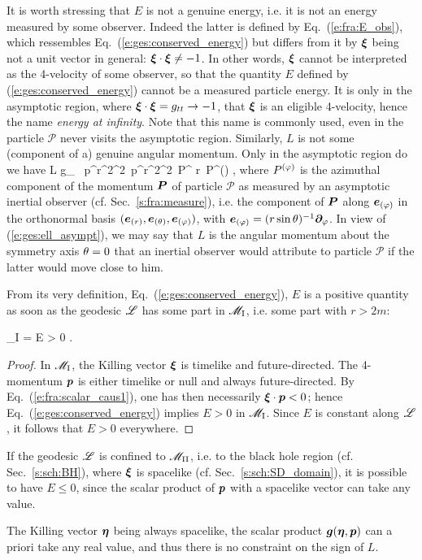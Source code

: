 It is worth stressing that $E$ is not a genuine energy, i.e. it is not
an energy measured by some observer. Indeed the latter is defined by
Eq.~(\ref{e:fra:E_obs}), which ressembles Eq.~(\ref{e:ges:conserved_energy})
but differs from it by $\bm{\xi}$ being not a unit vector in general:
$\bm{\xi}\cdot\bm{\xi} \not = -1$. In other words, $\bm{\xi}$ cannot
be interpreted as the 4-velocity of some observer, so that the quantity
$E$ defined by (\ref{e:ges:conserved_energy}) cannot be a measured
particle energy. It is only in the asymptotic region, where $\bm{\xi}\cdot\bm{\xi} = g_{tt}
\rightarrow -1$, that $\bm{\xi}$ is an eligible 4-velocity, hence the name
\emph{energy at infinity}. Note that this name is commonly used, even in the
particle $\mathscr{P}$ never visits the asymptotic region.
Similarly, $L$ is not some (component of a) genuine angular momentum. Only in the
asymptotic region do we have
\be \label{e:ges:ell_asympt}
    L \simeq g_{\ph\ph} \, p^\ph \simeq r^2\sin^2\ph \, p^\ph \simeq r^2\sin^2\theta \, P^\ph
    \simeq r\sin\th \, P^{(\ph)} ,
\ee
where $P^{(\varphi)}$ is the azimuthal component of the momentum $\bm{P}$ of particle $\mathscr{P}$
as measured by an asymptotic inertial observer (cf. Sec.~\ref{s:fra:measure}), i.e.
the component of $\bm{P}$ along $\bm{e}_{(\varphi)}$ in the orthonormal basis $(\bm{e}_{(r)}, \bm{e}_{(\theta)}, \bm{e}_{(\varphi)})$, with $\bm{e}_{(\varphi)} = (r\sin\theta)^{-1} \bm{\partial}_\varphi$.
In view of (\ref{e:ges:ell_asympt}), we may say that $L$ is the angular momentum
about the symmetry axis $\theta=0$ that an inertial observer would attribute to
particle $\mathscr{P}$ if the latter would move close to him.

From its very definition, Eq.~(\ref{e:ges:conserved_energy}), $E$ is
a positive
quantity as soon as the geodesic $\mathscr{L}$ has some part in $\mathscr{M}_{\rm I}$, i.e.
some part with $r>2m$:
\begin{greybox}
\be \label{e:ges:E_positive_M_I}
    \Li \cap \M_{\rm I} \not= \varnothing \quad \Longrightarrow \quad E > 0 .
\ee
\end{greybox}
\begin{proof}
In $\mathscr{M}_{\rm I}$, the Killing vector $\bm{\xi}$ is timelike and future-directed.
The 4-momentum $\bm{p}$ is either timelike or null and always future-directed.
By Eq.~(\ref{e:fra:scalar_caus1}), one has then necessarily $\bm{\xi}\cdot\bm{p} < 0$; hence Eq.~(\ref{e:ges:conserved_energy})
implies $E > 0$ in $\mathscr{M}_{\rm I}$. Since $E$ is constant along $\mathscr{L}$, it
follows that $E > 0$ everywhere.
\end{proof}
\begin{remark}
If the geodesic $\mathscr{L}$ is confined to $\mathscr{M}_{\rm II}$, i.e. to the black hole
region (cf. Sec.~\ref{s:sch:BH}),
where $\bm{\xi}$ is spacelike (cf. Sec.~\ref{s:sch:SD_domain}),
it is possible to have $E \leq 0$, since the
scalar product of $\bm{p}$ with a spacelike vector can take any value.
\end{remark}
\begin{remark}\label{r:ges:L_any_sign}
The Killing vector $\bm{\eta}$ being always spacelike,
the scalar product $\bm{g}(\bm{\eta},\bm{p})$ can a priori take any real value, and
thus there is no constraint
on the sign of $L$.
\end{remark}

